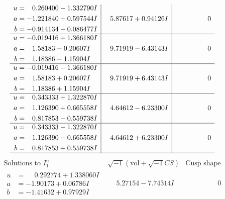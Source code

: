 \documentclass[1p]{elsarticle_modified}
\theoremstyle{definition}
\newcommand{\I}{\sqrt{-1}}
\begin{document}
$$\begin{array}{c|c|c}
\begin{aligned}
u &= \phantom{-}0.260400 - 1.332790 I \\
a &= -1.221840 + 0.597544 I \\
b &= -0.914134 - 0.086477 I\end{aligned}
 & \phantom{-}5.87617 + 0.94126 I & \phantom{-0.000000 } 0 \\ \hline\begin{aligned}
u &= -0.019416 + 1.366180 I \\
a &= \phantom{-}1.58183 - 0.20607 I \\
b &= \phantom{-}1.18386 - 1.15904 I\end{aligned}
 & \phantom{-}9.71919 - 6.43143 I & \phantom{-0.000000 } 0 \\ \hline\begin{aligned}
u &= -0.019416 - 1.366180 I \\
a &= \phantom{-}1.58183 + 0.20607 I \\
b &= \phantom{-}1.18386 + 1.15904 I\end{aligned}
 & \phantom{-}9.71919 + 6.43143 I & \phantom{-0.000000 } 0 \\ \hline\begin{aligned}
u &= \phantom{-}0.343333 + 1.322870 I \\
a &= \phantom{-}1.126390 + 0.665558 I \\
b &= \phantom{-}0.817853 - 0.559738 I\end{aligned}
 & \phantom{-}4.64612 - 6.23300 I & \phantom{-0.000000 } 0 \\ \hline\begin{aligned}
u &= \phantom{-}0.343333 - 1.322870 I \\
a &= \phantom{-}1.126390 - 0.665558 I \\
b &= \phantom{-}0.817853 + 0.559738 I\end{aligned}
 & \phantom{-}4.64612 + 6.23300 I & \phantom{-0.000000 } 0\\
 \hline 
 \end{array}$$\newpage$$\begin{array}{c|c|c}  
\text{Solutions to }I^u_{1}& \I (\text{vol} + \sqrt{-1}CS) & \text{Cusp shape}\\
 \hline 
\begin{aligned}
u &= \phantom{-}0.292774 + 1.338060 I \\
a &= -1.90173 + 0.06786 I \\
b &= -1.41632 + 0.97929 I\end{aligned}
 & \phantom{-}5.27154 - 7.74314 I & \phantom{-0.000000 } 0 \\ \hline\begin{aligned}

\end{aligned}
\end{array}$$
\end{document}
